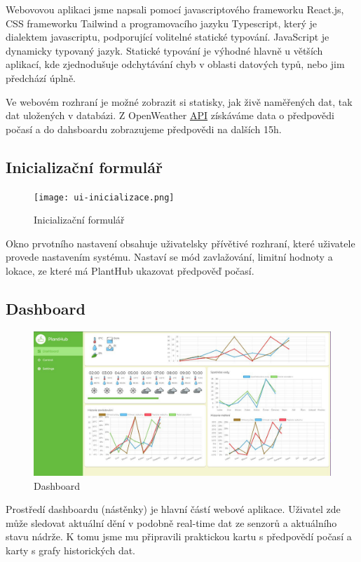 \documentclass[czech,12pt,a4paper]{article}
\begin{document}
Webovovou aplikaci jsme napsali pomocí javascriptového frameworku
React.js, CSS frameworku Tailwind a programovacího jazyku Typescript, který je dialektem javascriptu, podporující volitelné statické typování. JavaScript je dynamicky typovaný jazyk. Statické typování je výhodné hlavně u větších aplikací, kde zjednodušuje odchytávání chyb v oblasti datových typů, nebo jim předchází úplně.

Ve webovém rozhraní je možné zobrazit si statisky, jak živě naměřených dat, tak dat uložených v databázi. Z OpenWeather \underline{\ac{API}} získáváme data o předpovědi počasí a do dahsboardu zobrazujeme předpovědi na dalších 15h.

\subsection{Inicializační formulář}

\begin{figure}[h]
	\centering
	\texttt{[image: ui-inicializace.png]}
	\caption{Inicializační formulář}
\end{figure}

Okno prvotního nastavení obsahuje uživatelsky přívětivé rozhraní, které uživatele provede nastavením systému. Nastaví se mód zavlažování, limitní hodnoty a lokace, ze které má PlantHub ukazovat předpověď počasí.

\clearpage

\subsection{Dashboard}

\begin{figure}[h]
	\centering
	\includegraphics[width=\linewidth]{web-ui.png}
	\caption{Dashboard}
\end{figure}

Prostředí dashboardu (nástěnky) je hlavní částí webové aplikace. Uživatel zde může sledovat aktuální dění v podobně real-time dat ze senzorů a aktuálního stavu nádrže. K tomu jsme mu připravili praktickou kartu s předpovědí počasí a karty s grafy historických dat.
\end{document}
